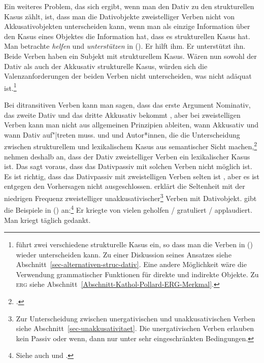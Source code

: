 Ein weiteres Problem, das sich ergibt, wenn man den Dativ zu den strukturellen Kasus
zählt, ist, dass man die Dativobjekte zweistelliger Verben nicht von Akkusativobjekten
unterscheiden kann, wenn man als einzige Information über den Kasus eines Objektes
die Information hat, dass es strukturellen Kasus hat. Man betrachte \zb \emph{helfen} und
\emph{unterstützen} in ().
\eal
\ex Er hilft ihm.
\ex Er unterstützt ihn.
\zl
Beide Verben haben ein Subjekt mit strukturellem Kasus. Wären nun sowohl der Dativ als auch der
Akkusativ strukturelle Kasus, würden sich die Valenzanforderungen der beiden Verben nicht
unterscheiden, was nicht adäquat ist.\footnote{
  \citet{Gunkel2003b} führt zwei verschiedene strukturelle Kasus ein, so dass man die Verben in
  () wieder unterscheiden kann. Zu einer Diskussion seines Ansatzes siehe
  Abschnitt~\ref{sec-alternativen-struc-dativ}. Eine andere Möglichkeit wäre die Verwendung
  grammatischer Funktionen für direkte und indirekte Objekte. Zu \textsc{erg} siehe Abschnitt~\ref{Abschnitt-Kathol-Pollard-ERG-Merkmal}.%
}

Bei ditransitiven Verben kann man sagen, dass das erste Argument Nominativ, das zweite
Dativ und das dritte Akkusativ bekommt \citep[49]{Wunderlich97a}, aber bei zweistelligen Verben kann man nicht aus allgemeinen
Prinzipien ableiten, wann Akkusativ und wann Dativ auf"|treten muss.
 und
\citet[]{Stechow90a} und Autor*innen, die die Unterscheidung zwischen
strukturellem und lexikalischem Kasus aus semantischer Sicht machen,\footnote{
  \textcites[]{Kaufmann95a}[--26]{Stiebels96a}[]{Olsen97c}[, 129]{Rapp97a}[]{Wunderlich97a}.%
}
nehmen deshalb an,
dass der Dativ zweistelliger Verben ein lexikalischer Kasus ist.
Das sagt voraus, dass das Dativpassiv mit solchen Verben nicht möglich ist.
Es ist richtig, dass das Dativpassiv mit zweistelligen Verben selten ist \citep[175]{HW95a},
aber es ist entgegen den Vorhersagen nicht ausgeschlossen.  \citet[]{Wegener90} erklärt die
Seltenheit mit der niedrigen Frequenz zweistelliger unakkusativischer\footnote{ 
  Zur Unterscheidung zwischen unergativischen und unakkusativischen Verben 
  siehe Abschnitt~\ref{sec-unakkusativitaet}. Die unergativischen Verben erlauben kein Passiv
  oder wenn, dann nur unter sehr eingeschränkten Bedingungen.%
}
Verben mit Dativobjekt.
\textcites[]{Wegener85a}[]{Wegener90} 
gibt die Beispiele in () an:\footnote{
        Siehe auch  und .
}
\eal
\label{ex-er-kriegte-geholfen}
\ex{}
Er kriegte von vielen geholfen / gratuliert / applaudiert.
\ex{} 
Man kriegt täglich gedankt.
\zl

